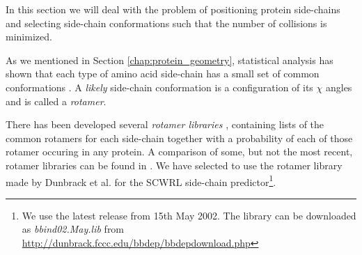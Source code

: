In this section we will deal with the problem of positioning protein
side-chains and selecting side-chain conformations such that
the number of collisions is minimized.

As we mentioned in Section \ref{chap:protein_geometry}, statistical
analysis has shown that each type of amino acid side-chain has a small
set of common conformations \cite{dunbrack2002rotamer}. A \textit{likely} side-chain
conformation is a configuration of its $\chi$ angles and is called a
\textit{rotamer}.

There has been developed several \textit{rotamer libraries}
\cite{dunbrack1997bayesian, lovell2000penultimate}, containing lists
of the common rotamers for each side-chain together with a probability
of each of those rotamer occuring in any protein. A comparison of some,
but not the most recent, rotamer libraries can be found in
\cite{dunbrack2002rotamer}. We have selected to use the rotamer
library made by Dunbrack et al. for the SCWRL side-chain
predictor\footnote{We use the latest release from 15th May 2002. The
  library can be downloaded as \textit{bbind02.May.lib} from
  \url{http://dunbrack.fccc.edu/bbdep/bbdepdownload.php}}.


